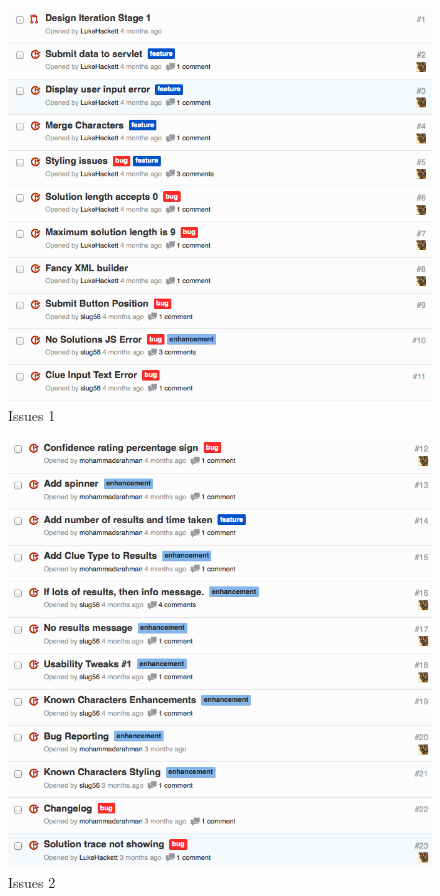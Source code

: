 \begin{figure}[H]
  \centering
  \includegraphics[width=\linewidth]{images/issues1.png}
  \caption{Issues 1}
  \label{fig:issues1}
\end{figure}
\begin{figure}[H]
  \centering
  \includegraphics[width=\linewidth]{images/issues2.png}
  \caption{Issues 2}
  \label{fig:issues2}
\end{figure}
